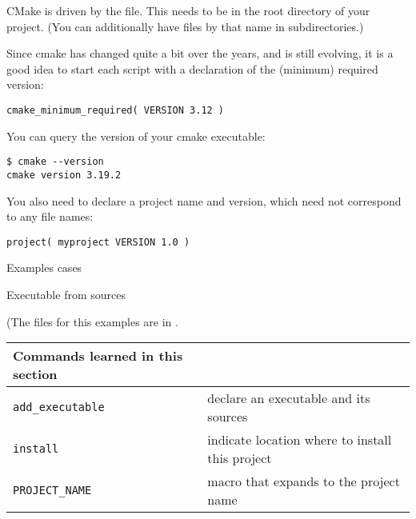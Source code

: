 CMake is driven by the  file.
This needs to be in the root directory of your project.
(You can additionally have files by that name in subdirectories.)

Since cmake has changed quite a bit over the years,
and is still evolving,
it is a good idea to start each script with a declaration
of the (minimum) required version:
\begin{lstlisting}
cmake_minimum_required( VERSION 3.12 )
\end{lstlisting}
You can query the version of your cmake executable:
\begin{verbatim}
$ cmake --version
cmake version 3.19.2
\end{verbatim}

You also need to declare a project name and version,
which need not correspond to any file names:
\begin{lstlisting}
project( myproject VERSION 1.0 )
\end{lstlisting}

\newpage
{} {Examples cases}

 {Executable from sources}

(The files for this examples are in .

\begin{tabular}{lp{3in}}
  \toprule
  Commands learned in this section\\
  \midrule
  \lstinline+add_executable+&declare an executable and its sources\\
  \lstinline+install+&indicate location where to install this project\\
  \lstinline+PROJECT_NAME+&macro that expands to the project name \\
  \bottomrule
\end{tabular}

